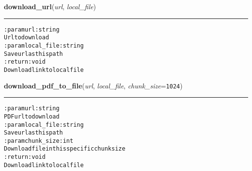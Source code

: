     \label{hal:internet:web:download_url}

    \vspace{0.5ex}

\hspace{.8\funcindent}\begin{boxedminipage}{\funcwidth}

    \raggedright \textbf{download\_url}(\textit{url}, \textit{local\_file})

    \vspace{-1.5ex}

    \rule{\textwidth}{0.5\fboxrule}
\setlength{\parskip}{2ex}
\begin{alltt}

:param url: string
    Url to download
:param local\_file: string
    Save url as this path
:return: void
    Download link to local file
\end{alltt}

\setlength{\parskip}{1ex}
    \end{boxedminipage}

    \label{hal:internet:web:download_pdf_to_file}

    \vspace{0.5ex}

\hspace{.8\funcindent}\begin{boxedminipage}{\funcwidth}

    \raggedright \textbf{download\_pdf\_to\_file}(\textit{url}, \textit{local\_file}, \textit{chunk\_size}={\tt 1024})

    \vspace{-1.5ex}

    \rule{\textwidth}{0.5\fboxrule}
\setlength{\parskip}{2ex}
\begin{alltt}

:param url: string
    PDF url to download
:param local\_file: string
    Save url as this path
:param chunk\_size: int
    Download file in this specific chunk size
:return: void
    Download link to local file
\end{alltt}

\setlength{\parskip}{1ex}
    \end{boxedminipage}


